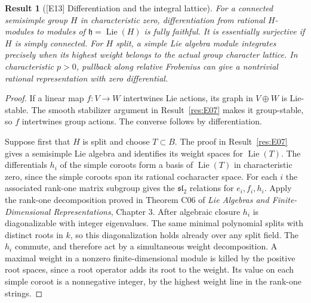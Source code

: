 \documentclass[11pt,a4paper,openany,oneside]{book}
\theoremstyle{resultstyle}
\newtheorem{statement}{Result}[chapter]
\newenvironment{result}[2]{\clubpenalty=10000\begin{statement}[\textnormal{[#1]} #2]\leavevmode\label{res:#1}\ignorespaces}{\end{statement}}
\theoremstyle{definition}
\numberwithin{equation}{chapter}
\begin{document}
\begin{result}{E13}{Differentiation and the integral lattice}
For a connected semisimple group \(H\) in characteristic zero, differentiation from rational \(H\)-modules to modules of \(\mathfrak h=\operatorname{Lie}(H)\) is fully faithful. It is essentially surjective if \(H\) is simply connected. For \(H\) split, a simple Lie algebra module integrates precisely when its highest weight belongs to the actual group character lattice. In characteristic \(p>0\), pullback along relative Frobenius can give a nontrivial rational representation with zero differential.
\end{result}
\begin{proof}
If a linear map \(f\colon V\to W\) intertwines Lie actions, its graph in \(V\oplus W\) is Lie-stable. The smooth stabilizer argument in Result~\ref{res:E07} makes it group-stable, so \(f\) intertwines group actions. The converse follows by differentiation.

Suppose first that \(H\) is split and choose \(T\subset B\).
The proof in Result~\ref{res:E07} gives a semisimple Lie algebra
and identifies its weight spaces for \(\operatorname{Lie}(T)\).
The differentials \(h_i\) of the simple coroots form a basis of
\(\operatorname{Lie}(T)\) in characteristic zero, since the
simple coroots span its rational cocharacter space. For each \(i\)
the associated rank-one matrix subgroup gives the
\(\mathfrak{sl}_2\) relations for \(e_i,f_i,h_i\).
Apply the rank-one decomposition proved in Theorem C06
of \emph{Lie Algebras and Finite-Dimensional Representations},
Chapter 3. After algebraic closure \(h_i\) is diagonalizable with
integer eigenvalues. The same minimal polynomial splits with
distinct roots in \(k\), so this diagonalization holds already
over any split field. The \(h_i\) commute, and therefore act by a
simultaneous weight decomposition. A maximal weight in a nonzero
finite-dimensional module is killed by the positive root spaces,
since a root operator adds its root to the weight. Its value on
each simple coroot is a nonnegative integer, by the highest
weight line in the rank-one strings.


\end{proof}
\end{document}
